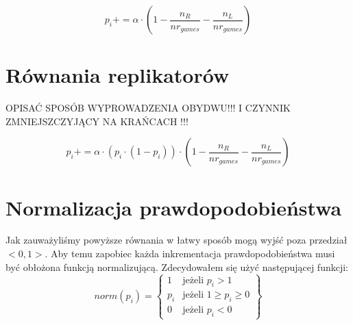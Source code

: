 \begin{equation} \label{eq:stand}
p_i += \alpha \cdot (1 - \frac{n_R}{nr_{games}} - \frac{n_L}{nr_{games}})
\end{equation}

\section{Równania replikatorów}
\label{sec:r_repli}

OPISAĆ SPOSÓB WYPROWADZENIA OBYDWU!!! I CZYNNIK ZMNIEJSZCZYJĄCY NA KRAŃCACH !!!

\begin{equation} \label{eq:repli}
p_i += \alpha \cdot (p_i \cdot (1 - p_i)) \cdot (1 - \frac{n_R}{nr_{games}} - \frac{n_L}{nr_{games}})
\end{equation}

\section{Normalizacja prawdopodobieństwa}
\label{sec:normalizacja}
Jak zauważyliśmy powyższe równania w łatwy sposób mogą wyjść poza przedział $<0,1>$. Aby temu zapobiec każda inkrementacja prawdopodobieństwa musi być obłożona funkcją normalizującą. Zdecydowałem się użyć następującej funkcji:
\begin{displaymath}
norm(p_i) = \left\{
\begin{array}{ll}
1 & \text{jeżeli } p_i > 1 \\
p_i & \text{jeżeli } 1 \geq p_i \geq 0 \\
0 & \text{jeżeli } p_i < 0
\end{array} 
\right\}
\end{displaymath}

